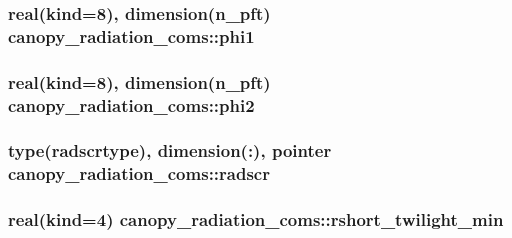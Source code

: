 \subsubsection[{phi1}]{\setlength{\rightskip}{0pt plus 5cm}real(kind=8), dimension(n\+\_\+pft) canopy\+\_\+radiation\+\_\+coms\+::phi1}\label{namespacecanopy__radiation__coms_a03002619fd623b8e11ded7e257d4579f}
\hypertarget{namespacecanopy__radiation__coms_a84f81efa08280199991186a9f501c053}{}
\subsubsection[{phi2}]{\setlength{\rightskip}{0pt plus 5cm}real(kind=8), dimension(n\+\_\+pft) canopy\+\_\+radiation\+\_\+coms\+::phi2}\label{namespacecanopy__radiation__coms_a84f81efa08280199991186a9f501c053}
\hypertarget{namespacecanopy__radiation__coms_a77faeb46000116eff7d27da31a4ddfde}{}
\subsubsection[{radscr}]{\setlength{\rightskip}{0pt plus 5cm}type({\bf radscrtype}), dimension(\+:), pointer canopy\+\_\+radiation\+\_\+coms\+::radscr}\label{namespacecanopy__radiation__coms_a77faeb46000116eff7d27da31a4ddfde}
\hypertarget{namespacecanopy__radiation__coms_a3a226b3cec6a97cda6b397806da31988}{}
\subsubsection[{rshort\+\_\+twilight\+\_\+min}]{\setlength{\rightskip}{0pt plus 5cm}real(kind=4) canopy\+\_\+radiation\+\_\+coms\+::rshort\+\_\+twilight\+\_\+min}\label{namespacecanopy__radiation__coms_a3a226b3cec6a97cda6b397806da31988}
\hypertarget{namespacecanopy__radiation__coms_a6e9ba20bb9e4cdec42f508154e237a0d}{}

